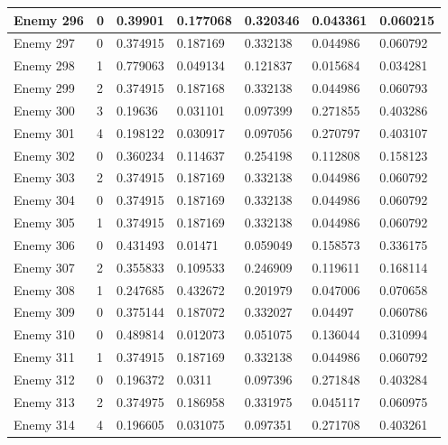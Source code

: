 \begin{longtable}{|l|l|l|l|l|l|l|}
	Enemy 296 & 0 & {\color[HTML]{009901} 0.39901} & 0.177068 & 0.320346 & 0.043361 & 0.060215 \\ \hline
	Enemy 297 & 0 & {\color[HTML]{009901} 0.374915} & 0.187169 & 0.332138 & 0.044986 & 0.060792 \\ \hline
	Enemy 298 & 1 & 0.779063 & {\color[HTML]{FE0000} 0.049134} & 0.121837 & 0.015684 & 0.034281 \\ \hline
	Enemy 299 & 2 & 0.374915 & 0.187168 & {\color[HTML]{FE0000} 0.332138} & 0.044986 & 0.060793 \\ \hline
	Enemy 300 & 3 & 0.19636 & 0.031101 & 0.097399 & {\color[HTML]{FE0000} 0.271855} & 0.403286 \\ \hline
	Enemy 301 & 4 & 0.198122 & 0.030917 & 0.097056 & 0.270797 & {\color[HTML]{009901} 0.403107} \\ \hline
	Enemy 302 & 0 & {\color[HTML]{009901} 0.360234} & 0.114637 & 0.254198 & 0.112808 & 0.158123 \\ \hline
	Enemy 303 & 2 & 0.374915 & 0.187169 & {\color[HTML]{FE0000} 0.332138} & 0.044986 & 0.060792 \\ \hline
	Enemy 304 & 0 & {\color[HTML]{009901} 0.374915} & 0.187169 & 0.332138 & 0.044986 & 0.060792 \\ \hline
	Enemy 305 & 1 & 0.374915 & {\color[HTML]{FE0000} 0.187169} & 0.332138 & 0.044986 & 0.060792 \\ \hline
	Enemy 306 & 0 & {\color[HTML]{009901} 0.431493} & 0.01471 & 0.059049 & 0.158573 & 0.336175 \\ \hline
	Enemy 307 & 2 & 0.355833 & 0.109533 & {\color[HTML]{FE0000} 0.246909} & 0.119611 & 0.168114 \\ \hline
	Enemy 308 & 1 & 0.247685 & {\color[HTML]{009901} 0.432672} & 0.201979 & 0.047006 & 0.070658 \\ \hline
	Enemy 309 & 0 & {\color[HTML]{009901} 0.375144} & 0.187072 & 0.332027 & 0.04497 & 0.060786 \\ \hline
	Enemy 310 & 0 & {\color[HTML]{009901} 0.489814} & 0.012073 & 0.051075 & 0.136044 & 0.310994 \\ \hline
	Enemy 311 & 1 & 0.374915 & {\color[HTML]{FE0000} 0.187169} & 0.332138 & 0.044986 & 0.060792 \\ \hline
	Enemy 312 & 0 & {\color[HTML]{FE0000} 0.196372} & 0.0311 & 0.097396 & 0.271848 & 0.403284 \\ \hline
	Enemy 313 & 2 & 0.374975 & 0.186958 & {\color[HTML]{FE0000} 0.331975} & 0.045117 & 0.060975 \\ \hline
	Enemy 314 & 4 & 0.196605 & 0.031075 & 0.097351 & 0.271708 & {\color[HTML]{009901} 0.403261} \\ \hline

\end{longtable}
